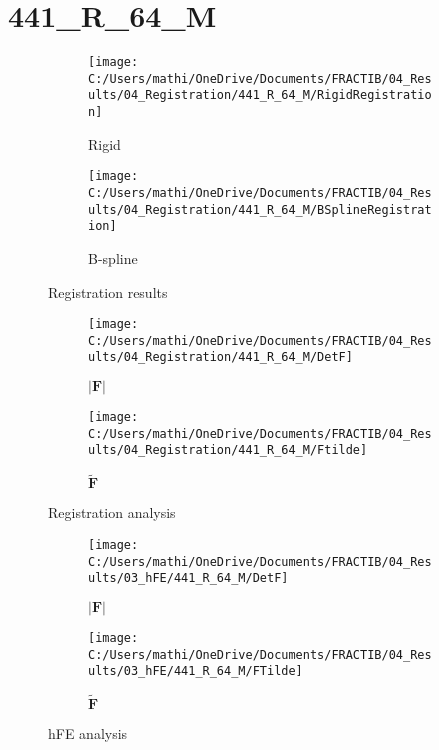 \documentclass{article}%
\begin{document}
%
\newpage%
\section*{441\_R\_64\_M}%
\label{sec:441R64M}%


\begin{figure}[h!]%
\begin{subfigure}[b]{0.5\linewidth}%
\texttt{[image: C:/Users/mathi/OneDrive/Documents/FRACTIB/04\_Results/04\_Registration/441\_R\_64\_M/RigidRegistration]}%
\caption{Rigid}%
\end{subfigure}%
\begin{subfigure}[b]{0.5\linewidth}%
\texttt{[image: C:/Users/mathi/OneDrive/Documents/FRACTIB/04\_Results/04\_Registration/441\_R\_64\_M/BSplineRegistration]}%
\caption{B{-}spline}%
\end{subfigure}%
\caption{Registration results}%
\end{figure}

%


\begin{figure}[h!]%
\begin{subfigure}[b]{0.5\linewidth}%
\texttt{[image: C:/Users/mathi/OneDrive/Documents/FRACTIB/04\_Results/04\_Registration/441\_R\_64\_M/DetF]}%
\caption{$|\mathbf{F}|$}%
\end{subfigure}%
\begin{subfigure}[b]{0.5\linewidth}%
\texttt{[image: C:/Users/mathi/OneDrive/Documents/FRACTIB/04\_Results/04\_Registration/441\_R\_64\_M/Ftilde]}%
\caption{$\tilde{\mathbf{F}}$}%
\end{subfigure}%
\caption{Registration analysis}%
\end{figure}

%


\begin{figure}[h!]%
\begin{subfigure}[b]{0.5\linewidth}%
\texttt{[image: C:/Users/mathi/OneDrive/Documents/FRACTIB/04\_Results/03\_hFE/441\_R\_64\_M/DetF]}%
\caption{$|\mathbf{F}|$}%
\end{subfigure}%
\begin{subfigure}[b]{0.5\linewidth}%
\texttt{[image: C:/Users/mathi/OneDrive/Documents/FRACTIB/04\_Results/03\_hFE/441\_R\_64\_M/FTilde]}%
\caption{$\tilde{\mathbf{F}}$}%
\end{subfigure}%
\caption{hFE analysis}%
\end{figure}
\end{document}
